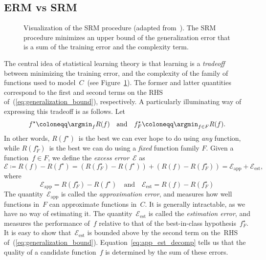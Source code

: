 \documentclass[11pt,a4paper]{article}
\numberwithin{equation}{section}
\newcommand{\apperr}{\mathcal{E}_{\mathrm{app}}}
\newcommand{\esterr}{\mathcal{E}_{\mathrm{est}}}
\begin{document}
\subsection{ERM vs SRM}
\label{sec:erm_vs_srm}

\begin{figure}
\centering
{}
\caption{Visualization of the SRM procedure (adapted from~\citet{ml_mohri}). The
SRM procedure minimizes an upper bound of the generalization error that is a sum
of the training error and the complexity term.\label{fig:srm_graph}}
\end{figure}

The central idea of statistical learning theory is that learning is a
\emph{tradeoff} between minimizing the training error, and the complexity of the
family of functions used to model~$C$~(see Figure~\ref{fig:srm_graph}). The
former and latter quantities correspond to the first and second terms on the RHS
of~(\ref{eq:generalization_bound}), respectively. A particularly illuminating
way of expressing this tradeoff is as follows. Let
\[
	f^\star \coloneqq \argmin_{f} R(f) \quad\text{and}\quad
	f_F^\star \coloneqq \argmin_{f \in F} R(f).
\]
In other words, $R(f^\star)$~is the best we can ever hope to do using \emph{any}
function, while $R(f_F^\star)$~is the best we can do using a \emph{fixed}
function family $F$. Given a function~$f \in F$, we define the \emph{excess
error}~$\mathcal{E}$ as
\begin{equation}
	\mathcal{E} \coloneqq R(f) - R(f^\star)
		= (R(f_F^\star) - R(f^\star)) + (R(f) - R(f_F^\star))
		= \apperr + \esterr,
	\label{eq:app_est_decomp}
\end{equation}
where
\[
	\apperr = R(f_F^\star) - R(f^\star)
	\quad\text{and}\quad
	\esterr = R(f) - R(f_F^\star)
\]
The quantity~$\apperr$ is called the \emph{approximation error}, and measures
how well functions in~$F$ can approximate functions in~$C$. It is generally
intractable, as we have no way of estimating it. The quantity~$\esterr$ is
called the \emph{estimation error}, and measures the performance of~$f$ relative
to that of the best-in-class hypothesis~$f_F^\star$. It is easy to show
that~$\esterr$ is bounded above by the second term on the~RHS
of~(\ref{eq:generalization_bound}). Equation~\ref{eq:app_est_decomp} tells us
that the quality of a candidate function~$f$ is determined by the sum of these
errors.
\end{document}

